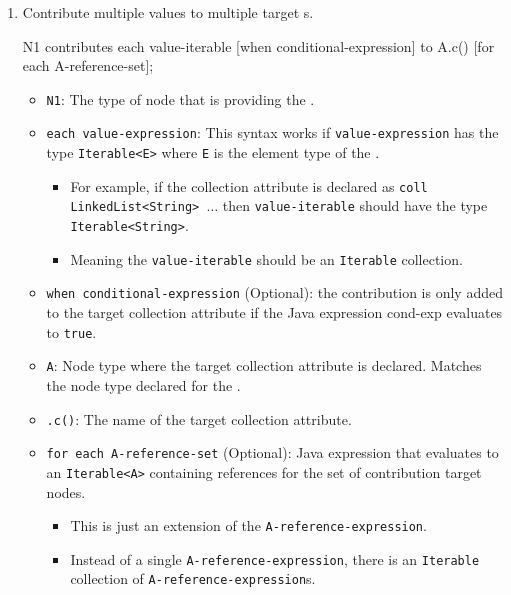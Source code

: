\begin{definition}[Contribution]
\begin{enumerate}[noitemsep]
  \item Contribute multiple values to multiple target s.
\begin{javasource}
  N1 contributes each value-iterable
    [when conditional-expression]
    to A.c()
    [for each A-reference-set];
\end{javasource}
    \begin{itemize}[noitemsep]
    \item \texttt{N1}: The type of  node that is providing the .
    \item \texttt{each value-expression}: This syntax works if \texttt{value-expression} has the type \texttt{Iterable<E>} where \texttt{E} is the element type of the .
      \begin{itemize}[noitemsep]
      \item For example, if the collection attribute is declared as \texttt{coll LinkedList<String> $\ldots$} then \texttt{value-iterable} should have the type \texttt{Iterable<String>}.
      \item Meaning the \texttt{value-iterable} should be an \texttt{Iterable} collection.
      \end{itemize}
    \item \texttt{when conditional-expression} (Optional): the contribution is only added to the target collection attribute if the Java expression cond-exp evaluates to \texttt{true}.
    \item \texttt{A}: Node type where the target collection attribute is declared. Matches the node type declared for the .
    \item \texttt{.c()}: The name of the target collection attribute.
    \item \texttt{for each A-reference-set} (Optional): Java expression that evaluates to an \texttt{Iterable<A>} containing references for the set of contribution target nodes.
      \begin{itemize}[noitemsep]
      \item This is just an extension of the \texttt{A-reference-expression}.
      \item Instead of a single \texttt{A-reference-expression}, there is an \texttt{Iterable} collection of \texttt{A-reference-expression}s.
      \end{itemize}
    \end{itemize}
  \end{enumerate}
\end{definition}

